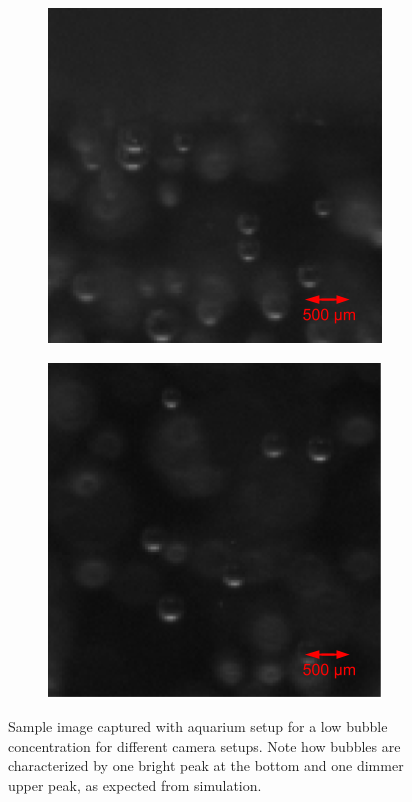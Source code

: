 \begin{figure}[h]
			\begin{subfigure}[t]{.4\textwidth}
				\centering
				\includegraphics[scale=0.5]{images/aq_result_surf_small_1.png}
				\caption{}
			\end{subfigure}\hfill
			\begin{subfigure}[t]{.4\textwidth}
				\centering
				\includegraphics[scale=0.5]{images/aq_result_surf_small_2.png}
				\caption{}
			\end{subfigure}\hfill			
			\caption{Sample image captured with aquarium setup for a low bubble concentration for different camera setups. Note how bubbles are characterized by one bright peak at the bottom and one dimmer upper peak, as expected from simulation.}			
			\label{fig:aqauarium_result}
		\end{figure}
					

